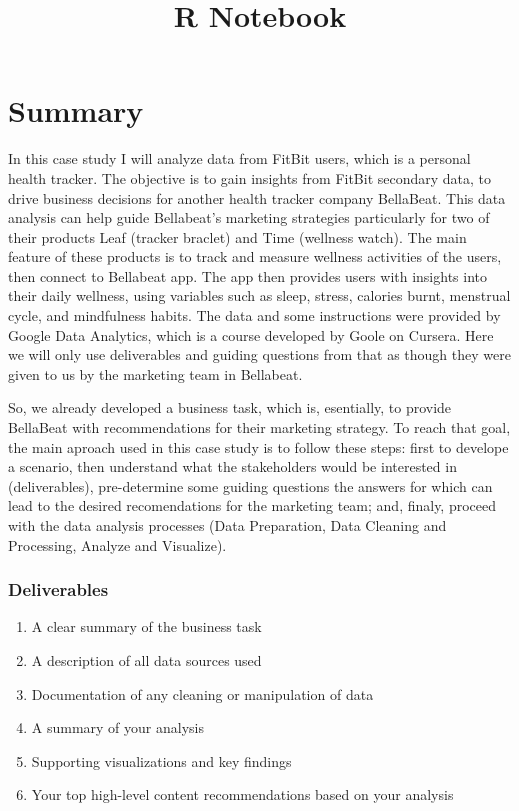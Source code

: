 \documentclass[
]{article}
\title{R Notebook}
\author{}
\date{\vspace{-2.5em}}
\providecommand{\tightlist}{%
  \setlength{\itemsep}{0pt}\setlength{\parskip}{0pt}}
\begin{document}
\maketitle

\hypertarget{summary}{%
\section{Summary}\label{summary}}

In this case study I will analyze data from FitBit users, which is a
personal health tracker. The objective is to gain insights from FitBit
secondary data, to drive business decisions for another health tracker
company BellaBeat. This data analysis can help guide Bellabeat's
marketing strategies particularly for two of their products Leaf
(tracker braclet) and Time (wellness watch). The main feature of these
products is to track and measure wellness activities of the users, then
connect to Bellabeat app. The app then provides users with insights into
their daily wellness, using variables such as sleep, stress, calories
burnt, menstrual cycle, and mindfulness habits. The data and some
instructions were provided by Google Data Analytics, which is a course
developed by Goole on Cursera. Here we will only use deliverables and
guiding questions from that as though they were given to us by the
marketing team in Bellabeat.

So, we already developed a business task, which is, esentially, to
provide BellaBeat with recommendations for their marketing strategy. To
reach that goal, the main aproach used in this case study is to follow
these steps: first to develope a scenario, then understand what the
stakeholders would be interested in (deliverables), pre-determine some
guiding questions the answers for which can lead to the desired
recomendations for the marketing team; and, finaly, proceed with the
data analysis processes (Data Preparation, Data Cleaning and Processing,
Analyze and Visualize).

\hypertarget{deliverables}{%
\subsubsection{Deliverables}\label{deliverables}}

\begin{enumerate}
\def\labelenumi{\arabic{enumi}.}
\tightlist
\item
  A clear summary of the business task
\item
  A description of all data sources used
\item
  Documentation of any cleaning or manipulation of data
\item
  A summary of your analysis
\item
  Supporting visualizations and key findings
\item
  Your top high-level content recommendations based on your analysis
\end{enumerate}
\end{document}
